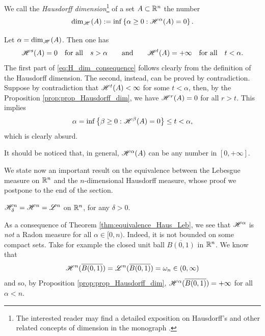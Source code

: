 \begin{definition}
We call the \emph{Hausdorff dimension}\footnote{The interested reader may find a detailed exposition on Hausdorff's and other related concepts of dimension in the monograph \cite{Falconer}.} of a set $A\subset \mathbb{R}^n$ the number
\[
{\rm dim}_{\mathscr{H}^{}}(A) := \inf\left\{ \alpha \geq 0 : \mathscr{H}^{\alpha}(A) = 0
\right\}.
\]
\end{definition}

\begin{remark}
Let $\alpha = {\rm dim}_{\mathscr{H}^{}}(A)$. Then one has
\begin{equation} \label{eq:H_dim_consequence}
\mathscr{H}^{s}(A) = 0 \quad \text{for all} \quad s > \alpha
\qquad \text{and} \qquad
\mathscr{H}^{t}(A) = +\infty \quad \text{for all} \quad t < \alpha.
\end{equation}
The first part of \eqref{eq:H_dim_consequence} follows clearly from the definition of the Hausdorff dimension. The second, instead, can be proved by contradiction. Suppose by contradiction that $\mathscr{H}^{t}(A) < \infty$ for some $t < \alpha$, then, by the Proposition \ref{prop:prop_Hausdorff_dim}, we have $\mathscr{H}^{r}(A) = 0$ for all $ r > t$. This implies 
$$\alpha = \inf\left\{ \beta \geq 0 : \mathscr{H}^{\beta}(A) = 0
\right\} \le t < \alpha,$$
which is clearly absurd.

It should be noticed that, in general, $\mathscr{H}^{\alpha}(A)$ can be any number in $[0, + \infty]$.
\end{remark}

We state now an important result on the equivalence between the Lebesgue measure on $\mathbb{R}^{n}$ and the $n$-dimensional Hausdorff measure, whose proof we postpone to the end of the section.

\begin{theorem} \label{thm:equivalence_Haus_Leb}
$\mathscr{H}^{n}_{\delta} = \mathscr{H}^{n} = \mathscr{L}^{n}$ on $\mathbb{R}^{n}$, for any $\delta > 0$.
\end{theorem}

\begin{remark} \label{rem:Haus_not_Radon}
As a consequence of Theorem \ref{thm:equivalence_Haus_Leb}, we see that $\mathscr{H}^{\alpha}$ is \emph{not} a Radon measure for all $\alpha \in
[0,n)$. Indeed, it is not bounded on some compact sets. Take for example the closed unit ball $\overline{B(0,1)}$ in $\mathbb{R}^n$. We know that 
\begin{equation*}
\mathscr{H}^{n}(\overline{B(0,1)}) = \mathscr{L}^{n}(\overline{B(0, 1)}) = \omega_{n} \in (0, \infty)
\end{equation*} 
and so, by Proposition \ref{prop:prop_Hausdorff_dim},
$\mathscr{H}^{\alpha}(\overline{B(0,1)}) = +\infty$ for all $\alpha < n$.
\end{remark}

